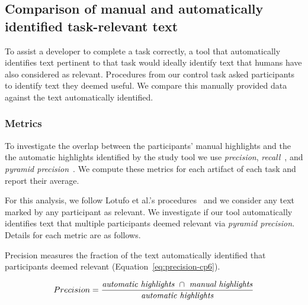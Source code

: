 
\subsection{Comparison of manual and automatically identified task-relevant text}
\label{cp6:comparison}


To assist a developer to complete a task correctly, a tool that
automatically identifies text pertinent to that task would ideally 
identify text that humans have also considered as relevant.
Procedures from our control task asked participants to identify text they deemed useful. We
 compare this manually provided data against the text automatically identified.




\subsubsection{Metrics}

To investigate the overlap between the participants' manual highlights and the 
the automatic highlights identified by the study tool we use \textit{precision}, 
\textit{recall}~\cite{manning2010IR}, and \textit{pyramid precision}~\cite{Nenkova2004}.
We compute these metrics for each artifact of each task and report their average.


For this analysis, we follow Lotufo et al.'s procedures~\cite{Lotufo2012} and we consider any text marked by any participant as relevant.
We investigate if our tool  automatically identifies text that multiple participants deemed relevant
 via \textit{pyramid precision}. 
Details for each metric are as follows. 

\medskip

Precision measures the fraction of the text automatically identified  that participants deemed relevant (Equation~\ref{eq:precision-cp6}). 

\smallskip
\begin{small}
\begin{equation}
    Precision = \frac{
        \text{\textit{automatic highlights}~} \cap 
        \text{~\textit{manual highlights}}
    }{\text{\textit{automatic highlights}}}
\label{eq:precision-cp6}    
\end{equation}
\end{small}


